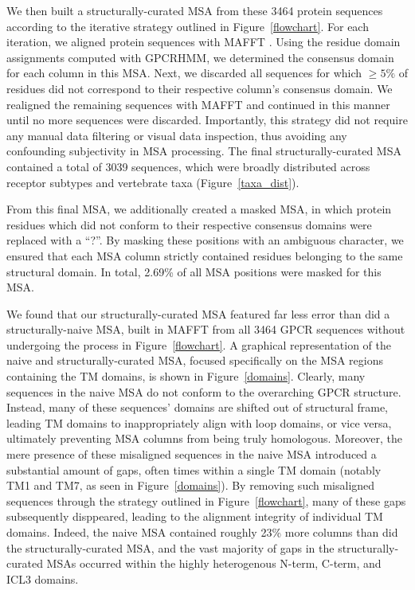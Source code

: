 \documentclass[fleqn,10pt]{wlpeerj}
\begin{document}
We then built a structurally-curated MSA from these 3464 protein sequences according to the iterative strategy outlined in Figure~\ref{flowchart}. For each iteration, we aligned protein sequences with MAFFT \citep{mafftv7}. Using the residue domain assignments computed with GPCRHMM, we determined the consensus domain for each column in this MSA. Next, we discarded all sequences for which $\geq 5\%$ of residues did not correspond to their respective column's consensus domain. We realigned the remaining sequences with MAFFT and continued in this manner until no more sequences were discarded. Importantly, this strategy did not require any manual data filtering or visual data inspection, thus avoiding any confounding subjectivity in MSA processing. The final structurally-curated MSA contained a total of 3039 sequences, which were broadly distributed across receptor subtypes and vertebrate taxa (Figure~\ref{taxa_dist}). 

From this final MSA, we additionally created a masked MSA, in which protein residues which did not conform to their respective consensus domains were replaced with a ``?''. By masking these positions with an ambiguous character, we ensured that each MSA column strictly contained residues belonging to the same structural domain. In total, 2.69\% of all MSA positions were masked for this MSA.

We found that our structurally-curated MSA featured far less error than did a structurally-naive MSA, built in MAFFT \citep{mafftv7} from all 3464 GPCR sequences without undergoing the process in Figure~\ref{flowchart}. A graphical representation of the naive and structurally-curated MSA, focused specifically on the MSA regions containing the TM domains, is shown in Figure~\ref{domains}. Clearly, many sequences in the naive MSA do not conform to the overarching GPCR structure. Instead, many of these sequences' domains are shifted out of structural frame, leading TM domains to inappropriately align with loop domains, or vice versa, ultimately preventing MSA columns from being truly homologous. Moreover, the mere presence of these misaligned sequences in the naive MSA introduced a substantial amount of gaps, often times within a single TM domain (notably TM1 and TM7, as seen in Figure~\ref{domains}). By removing such misaligned sequences through the strategy outlined in Figure~\ref{flowchart}, many of these gaps subsequently disppeared, leading to the alignment integrity of individual TM domains. Indeed, the naive MSA contained roughly 23\% more columns than did the structurally-curated MSA, and the vast majority of gaps in the structurally-curated MSAs occurred within the highly heterogenous N-term, C-term, and ICL3 domains. 
\end{document}
